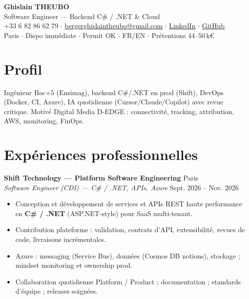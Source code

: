 \documentclass[10pt,a4paper]{article}
\begin{document}
\begin{center}
{\LARGE\bfseries Ghislain THEUBO}\\[1pt]
{\large Software Engineer --- Backend C\# / .NET \& Cloud}\\[2pt]
+33 6 82 86 62 79 $\cdot$
\href{mailto:bergerghislaintheubo@gmail.com}{bergerghislaintheubo@gmail.com} $\cdot$
\href{https://www.linkedin.com/in/berger-ghislain}{LinkedIn} $\cdot$
\href{https://github.com/Bergerghislain}{GitHub}\\[1pt]
Paris $\cdot$ Dispo imm\'ediate $\cdot$ Permit OK $\cdot$ FR/EN $\cdot$ Pr\'etentions 44--50\,k€
\end{center}

\section{Profil}
Ing\'enieur Bac+5 (Ensimag), backend C\#/.NET en prod (Shift), DevOps (Docker, CI, Azure), IA quotidienne (Cursor/Claude/Copilot) avec revue critique. Motiv\'e Digital Media D-EDGE : connectivit\'e, tracking, attribution, AWS, monitoring, FinOps.

\section{Exp\'eriences professionnelles}
\textbf{Shift Technology --- Platform Software Engineering} \hfill Paris\\
\textit{Software Engineer (CDI) --- C\# / .NET, APIs, Azure} \hfill Sept. 2026 -- Nov. 2026
\begin{itemize}
  \item Conception et d\'eveloppement de services et APIs REST haute performance en \textbf{C\# / .NET} (ASP.NET-style) pour SaaS multi-tenant.
  \item Contribution plateforme : validation, contrats d'API, extensibilit\'e, revues de code, livraisons incr\'ementales.
  \item Azure : messaging (Service Bus), donn\'ees (Cosmos DB notions), stockage ; mindset monitoring et ownership prod.
  \item Collaboration quotidienne Platform / Product ; documentation ; standards d'\'equipe ; releases soign\'ees.
\end{itemize}
\end{document}
